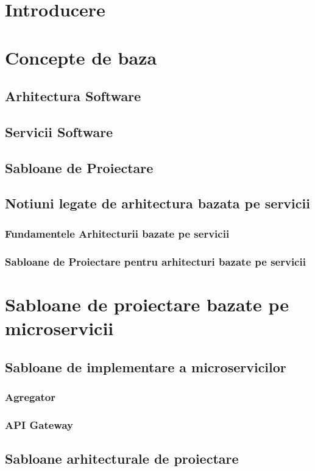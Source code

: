 \documentclass[12pt]{report}
\begin{document}
\tableofcontents
\cleardoublepage

\chapter{Introducere} 

\chapter{Concepte de baza} 
  \section{Arhitectura Software}
  \section{Servicii Software}
  \section{Sabloane de Proiectare}
  \section{Notiuni legate de arhitectura bazata pe servicii}
  	\subsection{Fundamentele Arhitecturii bazate pe servicii}
  	\subsection{Sabloane de Proiectare pentru arhitecturi bazate pe servicii}
  
\chapter{Sabloane de proiectare bazate pe microservicii}
	\section{Sabloane de implementare a microservicilor}
		\subsection{Agregator}
		\subsection{API Gateway}
	\section{Sabloane arhitecturale de proiectare}
\end{document}
